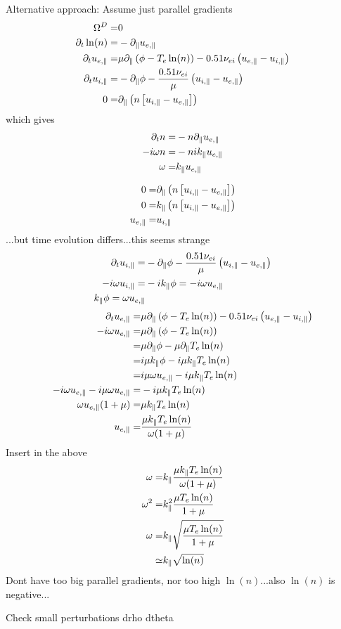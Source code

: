 Alternative approach:
Assume just parallel gradients
%
\begin{align*}
\Om^D =&
0
\\
%
%
%
\partial_t \ln(n)
=&
- \partial_\|u_{e,\|}
\\
%
%
%
\partial_t u_{e,\|}
 =&
 \mu \partial_\| \L(\phi - T_e  \ln(n)\R)
 - 0.51 \nu_{ei} \L(u_{e,\|}-u_{i,\|}\R)
\\
%
%
%
\partial_t u_{i,\|}
 =&
 - \partial_\|\phi
 - \frac{ 0.51 \nu_{ei} }{ \mu } \L(u_{i,\|}-u_{e,\|}\R)
\\
%
%
%
 0
  =&
 \partial_\| \L(n\L[ u_{i,\|} - u_{e,\|} \R]\R)
\end{align*}
%
which gives
%
\begin{align*}
    \partial_t n
=&
- n\partial_\|u_{e,\|}
\\
-i\omega n
=&
- nik_\|u_{e,\|}
\\
\omega
=&
k_\|u_{e,\|}
\end{align*}

\begin{align*}
 0
  =&
 \partial_\| \left(n\left[ u_{i,\|} - u_{e,\|} \right]\right)
 \\
 0
  =&
  k_\| \left(n\left[ u_{i,\|} - u_{e,\|} \right]\right)
 \\
 u_{e,\|}
  =&
  u_{i,\|}
\end{align*}
%
...but time evolution differs...this seems strange
%
\begin{align*}
\partial_t u_{i,\|}
 =&
 - \partial_\|\phi
 - \frac{ 0.51 \nu_{ei} }{ \mu } \left(u_{i,\|}-u_{e,\|}\right)
 \\
 -i\omega u_{i,\|}
 =&
 - ik_\|\phi
 =
 -i\omega u_{e,\|}
 \\
 k_\|\phi
 =
 \omega u_{e,\|}
\end{align*}
%
\begin{align*}
\partial_t u_{e,\|}
 =&
 \mu \partial_\| \left(\phi - T_e  \ln(n)\right)
 - 0.51 \nu_{ei} \left(u_{e,\|}-u_{i,\|}\right)
 \\
 -i\omega u_{e,\|}
 =&
 \mu \partial_\| \left(\phi - T_e  \ln(n)\right)
 \\
 =&
 \mu \partial_\| \phi
 - \mu \partial_\| T_e  \ln(n)
 \\
 =&
 i\mu k_\| \phi
 - i\mu k_\| T_e  \ln(n)
 \\
 =&
 i\mu  \omega u_{e,\|}
 - i\mu k_\| T_e  \ln(n)
 \\
 -i\omega u_{e,\|}
 - i\mu  \omega u_{e,\|}
 =&
 - i\mu k_\| T_e  \ln(n)
 \\
 \omega u_{e,\|}(1 + \mu)
 =&
 \mu k_\| T_e  \ln(n)
 \\
  u_{e,\|}
 =&
 \frac{\mu k_\| T_e  \ln(n)}{ \omega(1 + \mu) }
\end{align*}
%
Insert in the above
%
\begin{align*}
\omega
=&
k_\|\frac{\mu k_\| T_e  \ln(n)}{ \omega(1 + \mu) }
\\
\omega^2
=&
k_\|^2\frac{\mu T_e  \ln(n)}{ 1 + \mu }
\\
\omega
=&
k_\|\sqrt{\frac{\mu T_e  \ln(n)}{ 1 + \mu }}
\\
\simeq&
k_\|\sqrt{\ln(n)}
\end{align*}
%
Dont have too big parallel gradients, nor too high $\ln(n)$...also $\ln(n)$ is negative...

Check small perturbations
drho dtheta
